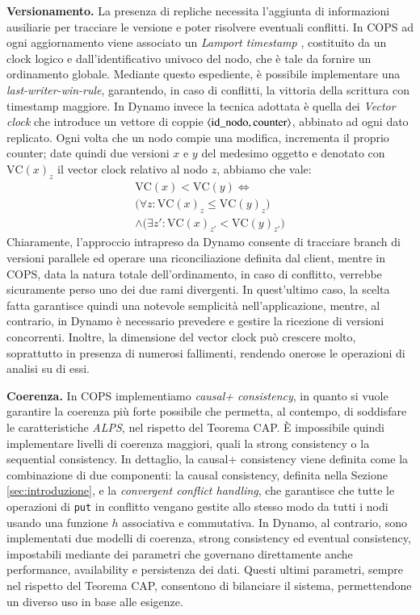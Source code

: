 \documentclass[twoside]{article}
\newcommand{\vclock}{\mathrm{VC}} %
\begin{document}
\begin{multicols}{2}
\textbf{Versionamento.} La presenza di repliche necessita l'aggiunta di informazioni ausiliarie per tracciare le versione e poter risolvere eventuali conflitti. In COPS ad ogni aggiornamento viene associato un \emph{Lamport timestamp} \cite{bib:lamport}, costituito da un clock logico e dall'identificativo univoco del nodo, che è tale da fornire un ordinamento globale. Mediante questo espediente, è possibile implementare una \emph{last-writer-win-rule}, garantendo, in caso di conflitti, la vittoria della scrittura con timestamp maggiore. In Dynamo invece la tecnica adottata è quella dei \emph{Vector clock} \cite{bib:lamport} che introduce un vettore di coppie $\langle\mathrm{id\char`_nodo}, \mathrm{counter}\rangle$, abbinato ad ogni dato replicato. Ogni volta che un nodo compie una modifica, incrementa il proprio counter; date quindi due versioni $x$ e $y$ del medesimo oggetto e denotato con $\vclock(x)_z$ il vector clock relativo al nodo $z$, abbiamo che vale:
\begin{multline*}
\vclock(x) < \vclock(y) \iff \\
\big( \forall z \mathrel{:} \vclock(x)_z \leq \vclock(y)_z \big) \\
\land \big( \exists z' \mathrel{:} \vclock(x)_{z'} < \vclock(y)_{z'} \big)
\end{multline*}
Chiaramente, l'approccio intrapreso da Dynamo consente di tracciare branch di versioni parallele ed operare una riconciliazione definita dal client, mentre in COPS, data la natura totale dell'ordinamento, in caso di conflitto, verrebbe sicuramente perso uno dei due rami divergenti. In quest'ultimo caso, la scelta fatta garantisce quindi una notevole semplicità nell'applicazione, mentre, al contrario, in Dynamo è necessario prevedere e gestire la ricezione di versioni concorrenti. Inoltre, la dimensione del vector clock può crescere molto, soprattutto in presenza di numerosi fallimenti, rendendo onerose le operazioni di analisi su di essi.

\textbf{Coerenza.} In COPS implementiamo \emph{causal+ consistency}, in quanto si vuole garantire la coerenza più forte possibile che permetta, al contempo, di soddisfare le caratteristiche \emph{ALPS}, nel rispetto del Teorema CAP. È impossibile quindi implementare livelli di coerenza maggiori, quali la strong consistency o la sequential consistency. In dettaglio, la causal+ consistency viene definita come la combinazione di due componenti: la causal consistency, definita nella Sezione \ref{sec:introduzione}, e la \emph{convergent conflict handling}, che garantisce che tutte le operazioni di \texttt{put} in conflitto vengano gestite allo stesso modo da tutti i nodi usando una funzione $h$ associativa e commutativa.
In Dynamo, al contrario, sono implementati due modelli di coerenza, strong consistency ed eventual consistency, impostabili mediante dei parametri che governano direttamente anche performance, availability e persistenza dei dati. Questi ultimi parametri, sempre nel rispetto del Teorema CAP, consentono di bilanciare il sistema, permettendone un diverso uso in base alle esigenze.


\end{multicols}
\end{document}

